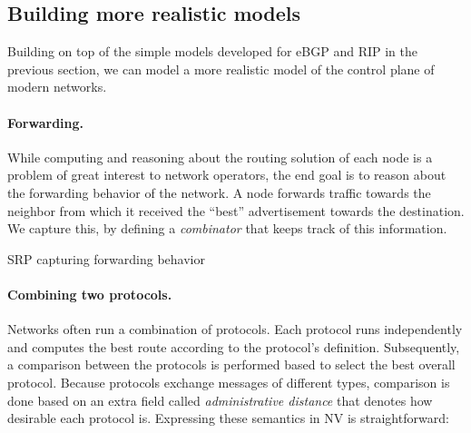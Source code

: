 \documentclass[sigconf,10pt]{acmart}
\begin{document}
\subsection{Building more realistic models}

Building on top of the simple models developed for eBGP and RIP in the
previous section, we can model a more realistic model of the control
plane of modern networks.

\paragraph{Forwarding.}

While computing and reasoning about the routing solution of each node
is a problem of great interest to network operators, the end goal is
to reason about the forwarding behavior of the network. A node
forwards traffic towards the neighbor from which it received the
``best'' advertisement towards the destination. We capture this, by
defining a \emph{combinator} that keeps track of this information.

\begin{listing}[ht]
\begin{ocamlcode}
  type /$\A_{\mathrm{fwd}}$/ = option {fwdEdge : /$\nat \times \nat$/;  protocol : /$\A$/}

  let /$\transfer_{\mathrm{fwd}}$/ e a =
    a /\bind/
      (/$\lambda$/ a.
        (/$\transfer$/ e a.protocol) /\bind/
          (/$\lambda$/ route. Some {fwdEdge = flip edge; protocol = route)

  let /$\merge_{\mathrm{fwd}}$/ u a b =
    let f = /$\lambda$/ a b. if (/$\merge$/ u a.protocol b.protocol) = a.protocol then a else b in      
      a // b 
\end{ocamlcode}
\caption{SRP capturing forwarding behavior}
\label{lst:fwd-srp}
\end{listing}

\paragraph{Combining two protocols.}
Networks often run a combination of protocols. Each protocol runs
independently and computes the best route according to the protocol's
definition. Subsequently, a comparison between the protocols is
performed based to select the best overall protocol. Because protocols
exchange messages of different types, comparison is done based on an
extra field called \emph{administrative distance} that denotes how
desirable each protocol is. Expressing these semantics in NV is
straightforward:
\end{document}
